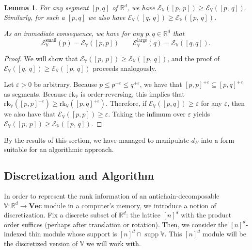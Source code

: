 \documentclass[a4paper,UKenglish,thm-restate]{article}
\newtheorem{lemma}[theorem]{Lemma}
\theoremstyle{definition}
\def\bbv{\mathbb{V}}
\def\bvec{\mathbf{Vec}}
\DeclareMathOperator{\supp}{supp}
\begin{document}
            
            \begin{lemma}\label{dEprojection}
                For any segment $[p, q]$ of $\mathbb{R}^d$, we have $\mathcal{E}_\mathbb{V}([p,\,p]) \geq \mathcal{E}_\mathbb{V}([p,\,q])$. Similarly, for such a $[p, q]$ we also have $\mathcal{E}_\mathbb{V}([q,\,q]) \geq \mathcal{E}_\mathbb{V}([p,\,q])$.

                As an immediate consequence, we have for any $p, q \in \mathbb{R}^d$ that \[\mathcal{E}^{\mathrm{small}}_\bbv(p) = \mathcal{E}_\bbv([p, p]) \qquad \mathcal{E}^{\mathrm{large}}_\bbv(q) = \mathcal{E}_\bbv([q, q]).\]
            \end{lemma}
            \begin{proof}
                We will show that $\mathcal{E}_\mathbb{V}([p,\,p]) \geq \mathcal{E}_\mathbb{V}([p,\,q])$, and the proof of $\mathcal{E}_\mathbb{V}([q,\,q]) \geq \mathcal{E}_\mathbb{V}([p,\,q])$ proceeds analogously.
                
                Let $\varepsilon > 0$ be arbitrary. Because $p \leq p^{+\varepsilon} \leq q^{+\varepsilon}$, we have that $[p, p]^{+\varepsilon} \subseteq [p, q]^{+\varepsilon}$ as segments. Because $\mathrm{rk}_\mathbb{V}$ is order-reversing, this implies that $\mathrm{rk}_\mathbb{V}([p, p]^{+\varepsilon}) \geq \mathrm{rk}_\mathbb{V}([p, q]^{+\varepsilon})$. Therefore, if $\mathcal{E}_{\bbv}([p, q]) \geq \varepsilon$ for any $\varepsilon$, then we also have that $\mathcal{E}_{\bbv}([p, p]) \geq \varepsilon$. Taking the infimum over $\varepsilon$ yields $\mathcal{E}_\mathbb{V}([p,\,p]) \geq \mathcal{E}_\mathbb{V}([p,\,q])$.
            \end{proof}

            By the results of this section, we have managed to manipulate $d_E$ into a form suitable for an algorithmic approach. 

        \subsection{Discretization and Algorithm}
            In order to represent the rank information of an antichain-decomposable $\bbv: \mathbb{R}^d \rightarrow \bvec$ module in a computer's memory, we introduce a notion of discretization. 
            Fix a discrete subset of $\mathbb{R}^d$: the lattice $[n]^d$ with the product order suffices (perhaps after translation or rotation). Then, we consider the $[n]^d$-indexed thin module whose support is $[n]^d \cap \supp \bbv$. This $[n]^d$ module will be the discretized version of $\mathbb{V}$ we will work with.
            
\end{document}
